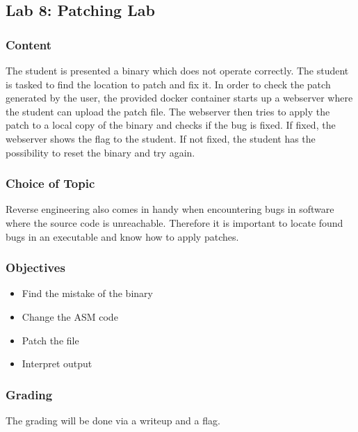 \subsection{Lab 8: Patching Lab}
\subsubsection*{Content}
The student is presented a binary which does not operate correctly. The student is tasked to find the location to patch and fix it. In order to check the patch generated by the user, the provided docker container starts up a webserver where the student can upload the patch file. The webserver then tries to apply the patch to a local copy of the binary and checks if the bug is fixed. If fixed, the webserver shows the flag to the student. If not fixed, the student has the possibility to reset the binary and try again.

\subsubsection*{Choice of Topic}
Reverse engineering also comes in handy when encountering bugs in software where the source code is unreachable. Therefore it is important to locate found bugs in an executable and know how to apply patches.
\subsubsection*{Objectives}
\begin{itemize}
    \item Find the mistake of the binary
    \item Change the ASM code
    \item Patch the file
    \item Interpret output
\end{itemize}
\subsubsection*{Grading}
The grading will be done via a writeup and a flag.
